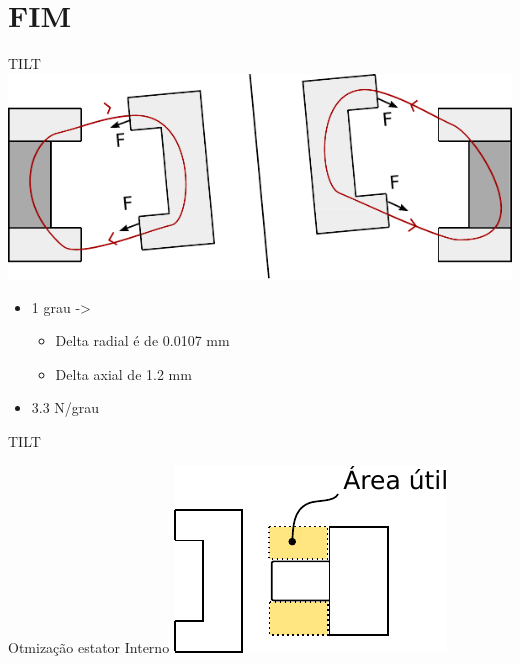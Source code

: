 \documentclass{beamer}
\begin{document}
\section{FIM}

\begin{frame}{TILT}
\centering
\includegraphics[width=0.7\linewidth]{modelo_circuito_passivo_forcas_t}

\begin{itemize}
\item 1 grau ->
\begin{itemize}
	\item Delta radial é de 0.0107 mm
	\item Delta axial de 1.2 mm
\end{itemize}
\item 3.3 N/grau
\end{itemize}

\end{frame}

\begin{frame}{TILT}
\centering

\end{frame}


\begin{frame}{Otmização estator Interno}
\centering
\includegraphics[width=0.7\linewidth]{modelo_ativo_bobina}
\end{frame}

\end{document}
